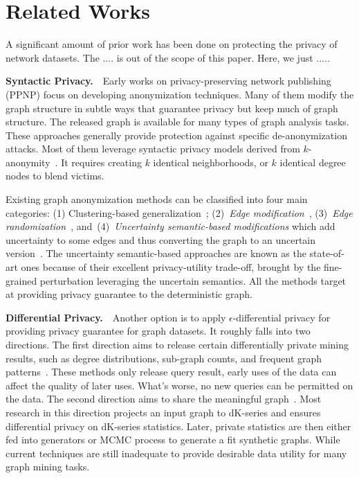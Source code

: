 \section{Related Works}
A significant amount of prior work has been done on protecting the privacy of network datasets.
The .... is out of the scope of this paper. Here, we just ..... 

\textbf{Syntactic Privacy.}~~Early works on privacy-preserving network publishing (PPNP) focus on developing anonymization techniques. Many of them modify the graph structure in subtle ways that guarantee privacy but keep much of graph structure.  The released graph is available for many types of graph analysis tasks. These approaches generally provide protection against specific de-anonymization attacks. Most of them leverage syntactic privacy models derived from $k$-anonymity~\cite{Sweeney:2002:KAM:774544.774552}. It requires creating $k$ identical neighborhoods, or $k$ identical degree nodes to blend victims. 

Existing graph anonymization methods can be classified into four main categories: (1) Clustering-based generalization~\cite{Hay_Anonymizing_2007,Bhagat_Class_2009,hay2010resisting}; (2)~{\em Edge modification}~\cite{Liu_Towards_2008, Zhou_Preserving_2008, Wang2011, Wu_k_2010, Skarkala_Privacy_2012}, 
(3)~{\em Edge randomization}~\cite{Liu_Privacy_2009,Ying_Randomizing_2008, Ninggal_Utility_2015},
and~(4)~{\em Uncertainty semantic-based modifications} which add uncertainty to some edges and thus converting the graph to an uncertain version~\cite{Boldi_Injecting_2012, Nguyen_Anonymizing_2015}. The uncertainty semantic-based approaches are known as the state-of-art ones because of their excellent privacy-utility trade-off, brought by the fine-grained perturbation leveraging the uncertain semantics. All the methods target at providing privacy guarantee to the deterministic graph.

 
\textbf{Differential Privacy.}~~Another option is to apply $\epsilon$-differential privacy for providing privacy guarantee for graph datasets. It roughly falls into two directions. The first direction aims to release certain differentially private mining results, such as degree distributions, sub-graph counts, and frequent graph patterns~\cite{Xiao_Differentially_2014,Day:2016}. These methods only release query result, early uses of the data can affect the quality of later uses. What's worse, no new queries can be permitted on the data. The second direction aims to share the meaningful graph~\cite{Sala_Sharing_2011}. Most research in this direction projects an input graph to dK-series and ensures differential privacy on dK-series statistics. Later, private statistics are then either fed into generators or MCMC process to generate a fit synthetic graphs. While current techniques are still inadequate to provide desirable data utility for many graph mining tasks.

